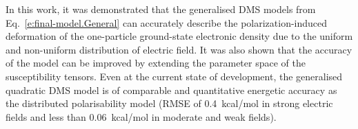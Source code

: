 \documentclass[aip,amsmath,amssymb,reprint,floatfix]{revtex4-1}
\begin{document}
%
In this work, it was demonstrated that the generalised DMS models from Eq.~\eqref{e:final-model.General}
can accurately describe the polarization\hyp{}induced deformation of the one\hyp{}particle ground\hyp{}state electronic density
due to the uniform and non\hyp{}uniform distribution of electric field.
It was also shown that the accuracy of the model can be improved by extending the parameter space of the susceptibility tensors.
Even at the current state of development, the generalised quadratic DMS model
is of comparable and quantitative energetic accuracy as the distributed polarisability model (RMSE of 0.4~kcal/mol in strong 
electric fields and less than 0.06~kcal/mol in moderate and weak fields).
\end{document}
